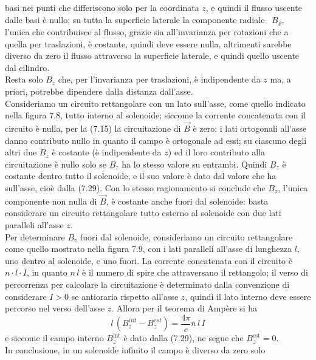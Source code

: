 basi nei punti che differiscono solo per la coordinata $z$, e quindi il flusso
uscente dalle basi \`e nullo; su tutta la superficie laterale la componente
radiale \ $B_\varrho$, l'unica che contribuisce al flusso, grazie sia
all'invarianza per rotazioni che a quella per traslazioni, \`e costante, quindi
deve essere nulla, altrimenti sarebbe diverso da zero il flusso attraverso la
superficie laterale, e quindi quello uscente dal cilindro.\\
Resta solo $B_z$ che, per l'invarianza per traslazioni, \`e indipendente da $z$
ma, a priori, potrebbe dipendere dalla distanza dall'asse.\\
Consideriamo un circuito rettangolare con un lato sull'asse, come quello
indicato nella figura 7.8, tutto interno al solenoide; siccome la corrente
concatenata con il circuito \`e nulla, per la (7.15) la circuitazione di
$\vec B$ \`e zero: i lati ortogonali all'asse danno contributo nullo in quanto
il campo \`e ortogonale ad essi; su ciascuno degli altri due $B_z$ \`e costante
(\`e indipendente da $z$) ed il loro contributo alla
circuitazione \`e nullo solo se $B_z$ ha lo stesso valore su entrambi. Quindi
$B_z$ \`e costante dentro tutto il solenoide, e il suo valore \`e dato dal
valore che ha sull'asse, cio\`e dalla (7.29). Con lo stesso ragionamento si
conclude che $B_z$, l'unica componente non nulla di $\vec B$, \`e costante anche
fuori dal solenoide: basta considerare un circuito rettangolare tutto esterno al
solenoide con due lati paralleli all'asse $z$.\\
Per determinare $B_z$ fuori dal solenoide, consideriamo un circuito rettangolare
come quello mostrato nella figura 7.9, con i lati paralleli all'asse di
lunghezza $l$, uno dentro al solenoide, e uno fuori. La corrente concatenata con
il circuito \`e $n\cdot l\cdot I$, in quanto $n\,l$ \`e il numero di spire che
attraversano il rettangolo; il verso di percorrenza per calcolare la
circuitazione \`e determinato dalla convenzione di considerare $I>0$ se
antioraria rispetto all'asse $z$, quindi il lato interno deve essere percorso
nel verso dell'asse $z$.
Allora per il teorema di Amp\`ere si ha
\begin{equation}
  l\,(B_z^{int}-B_z^{est})=\frac{4\pi}{c}n\,l\,I
  \tag{7.31}
\end{equation}
e siccome il campo interno $B_z^\mathrm{int}$ \`e dato dalla (7.29), ne segue
che $B_z^\mathrm{est}=0$.\\
In conclusione, in un solenoide infinito il campo \`e diverso da zero solo
